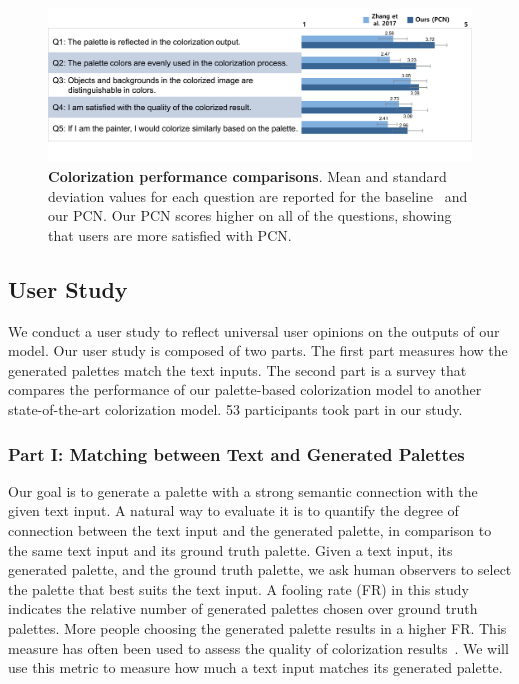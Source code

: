 \documentclass[runningheads]{llncs}
\begin{document}
\begin{figure}[t]
\centering
\includegraphics[width=\textwidth]{./user_study_result2.png}
\caption{\textbf{Colorization performance comparisons}. Mean and standard deviation values for each question are reported for the baseline~\cite{zhang2017real} and our PCN. Our PCN scores higher on all of the questions, showing that users are more satisfied with PCN.}\label{fig:user_study_result}
\end{figure}

\subsection{User Study} 
\label{sec:user_study}
We conduct a user study to reflect universal user opinions on the outputs of our model. Our user study is composed of two parts. The first part measures how the generated palettes match the text inputs. The second part is a survey that compares the performance of our palette-based colorization model to another state-of-the-art colorization model. 53 participants took part in our study.   

\subsubsection{Part I: Matching between Text and Generated Palettes}
Our goal is to generate a palette with a strong semantic connection with the given text input. A natural way to evaluate it is to quantify the degree of connection between the text input and the generated palette, in comparison to the same text input and its ground truth palette. Given a text input, its generated palette, and the ground truth palette, we ask human observers to select the palette that best suits the text input. A fooling rate (FR) in this study indicates the relative number of generated palettes chosen over ground truth palettes. More people choosing the generated palette results in a higher FR. This measure has often been used to assess the quality of colorization results~\cite{zhang2017real,guadarrama2017pixcolor}. We will use this metric to measure how much a text input matches its generated palette.
\end{document}
